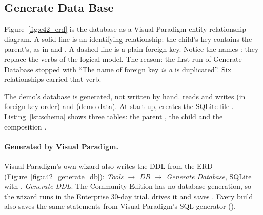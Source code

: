 \subsection{Generate Data Base}\label{sec:4.2.4}

Figure~\ref{fig:c42_erd} is the database as a Visual Paradigm entity relationship diagram. A solid line is an
identifying relationship: the child's key contains the parent's, as in  and . A
dashed line is a plain foreign key. Notice the names : they replace the verbs of the
logical model. The reason: the first run of Generate Database stopped with ``The name of foreign key \emph{is a}
is duplicated''. Six relationships carried that verb.


The demo's database is generated, not written by hand.  reads  and writes
\texttt{\schemaPath} (in foreign-key order) and  (demo data). At start-up,
 creates the SQLite file . Listing~\ref{lst:schema} shows three
tables: the parent , the child  and the composition .

%
{}

\paragraph{Generated by Visual Paradigm.} Visual Paradigm's own wizard also writes the DDL from the ERD
(Figure~\ref{fig:c42_generate_db}): \emph{Tools $\rightarrow$ DB $\rightarrow$ Generate Database}, SQLite with
, \emph{Generate DDL}. The Community Edition has no database generation, so the wizard runs in the
Enterprise 30-day trial.  drives it and saves . Every
build also saves the same statements from Visual Paradigm's SQL generator ().


